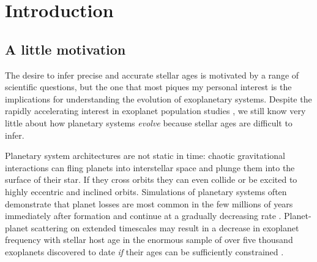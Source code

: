 \chapter{Introduction}
\label{chapter:intro}
\section{A little motivation}

The desire to infer precise and accurate stellar ages is motivated by a range
of scientific questions, but the one that most piques my personal interest is
the implications for understanding the evolution of exoplanetary systems.
Despite the rapidly accelerating interest in exoplanet population studies
\citep[e.g.][]{Petigura2013, Dressing2015, Foreman-mackey2014, Burke2015}, we
still know very little about how planetary systems {\it evolve} because
stellar ages are difficult to infer.

Planetary system architectures are not static in time: chaotic gravitational
interactions can fling planets into interstellar space and plunge them into
the surface of their star.
If they cross orbits they can even collide or be excited to highly eccentric
and inclined orbits.
Simulations of planetary systems often demonstrate that planet losses are most
common in the few millions of years immediately after formation and continue
at a gradually decreasing rate \citep[e.g.][]{Zhou2007, Smith2009, Funk2010,
Pu2015}.
Planet-planet scattering on extended timescales may result in a decrease in
exoplanet frequency with stellar host age in the enormous sample of over five
thousand exoplanets discovered to date {\it if} their ages can be sufficiently
constrained \citep{Veras2015}.


